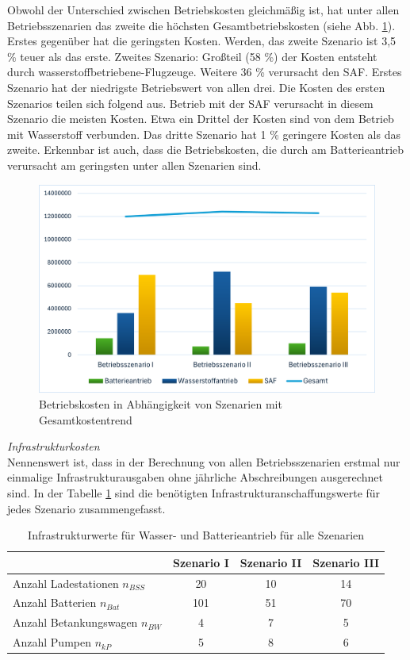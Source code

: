 Obwohl der Unterschied zwischen Betriebskosten gleichmäßig ist, hat unter allen Betriebsszenarien das zweite die höchsten Gesamtbetriebskosten (siehe Abb. \ref{res_betriebsszenarien}). 
Erstes gegenüber hat die geringsten Kosten. Werden, das zweite Szenario ist 3,5 \% teuer als das erste.
Zweites Szenario: Großteil (58 \%) der Kosten entsteht durch wasserstoffbetriebene-Flugzeuge. Weitere 36 \% verursacht den SAF.
Erstes Szenario hat der niedrigste Betriebswert von allen drei. Die Kosten des ersten Szenarios teilen sich folgend aus. 
Betrieb mit der SAF verursacht in diesem Szenario die meisten Kosten. Etwa ein Drittel
der Kosten sind von dem Betrieb mit Wasserstoff verbunden.
Das dritte Szenario hat 1 \% geringere Kosten als das zweite.
Erkennbar ist auch, dass die Betriebskosten, die durch am Batterieantrieb verursacht am geringsten unter allen Szenarien sind.
\begin{figure}[h]
	\centering
	\includegraphics[width=0.8\linewidth]{Bilder/betriebssz_res.png}
	\caption[Betriebskosten in Abhängigkeit von Szenarien mit Gesamtkostentrend]{Betriebskosten in Abhängigkeit von Szenarien mit Gesamtkostentrend}
	\label{res_betriebsszenarien}
\end{figure}

\textit{Infrastrukturkosten}\\
Nennenswert ist, dass in der Berechnung von allen Betriebsszenarien erstmal nur einmalige Infrastrukturausgaben 
ohne jährliche Abschreibungen ausgerechnet sind. In der Tabelle \ref{Infrastrukturwerte_res} sind die benötigten 
Infrastrukturanschaffungswerte für jedes Szenario zusammengefasst. 

\begin{table}[h]
	\begin{center}
    \caption{Infrastrukturwerte für Wasser- und Batterieantrieb für alle Szenarien}
	\label{Infrastrukturwerte_res}
	\begin{tabular}{|l|c|c|c|}
		\hline
		 & \textbf{Szenario I}& \textbf{Szenario II}& \textbf{Szenario III} \\ \hline
		Anzahl Ladestationen $n_{BSS}$ & 20 & 10& 14\\ \hline
		Anzahl Batterien $n_{Bat}$ & 101 & 51& 70 \\ \hline
		Anzahl Betankungswagen $n_{BW}$ & 4 & 7 & 5\\ \hline
		Anzahl Pumpen $n_{kP}$  & 5 & 8 & 6\\ \hline
	\end{tabular}
    \end{center}
\end{table}

